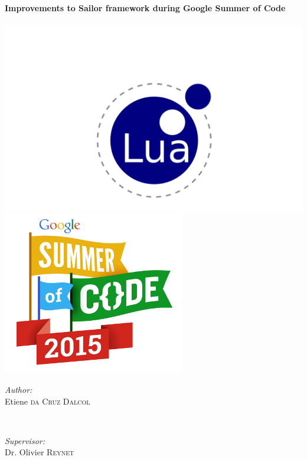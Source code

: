 \documentclass{article}
\begin{document}
\begin{titlepage}
\HRule \\[0.4cm]
{ \huge \bfseries Improvements to Sailor framework during Google Summer of Code}\\[0.4cm] %
\HRule \\[0.5cm]


\includegraphics[scale=0.15]{logo-lua.png}
\includegraphics[scale=0.3]{gsoclogo.jpg}\\[1.5cm]
 

\begin{minipage}{0.4\textwidth}
\begin{flushleft} \large
\emph{Author:}\\
Etiene \textsc{da Cruz Dalcol} %
\end{flushleft}
\end{minipage}
~
\begin{minipage}{0.4\textwidth}
\begin{flushright} \large
\emph{Supervisor:} \\
Dr. Olivier \textsc{Reynet} %
\end{flushright}
\end{minipage}\\[1.5cm]


\end{titlepage}
\end{document}
